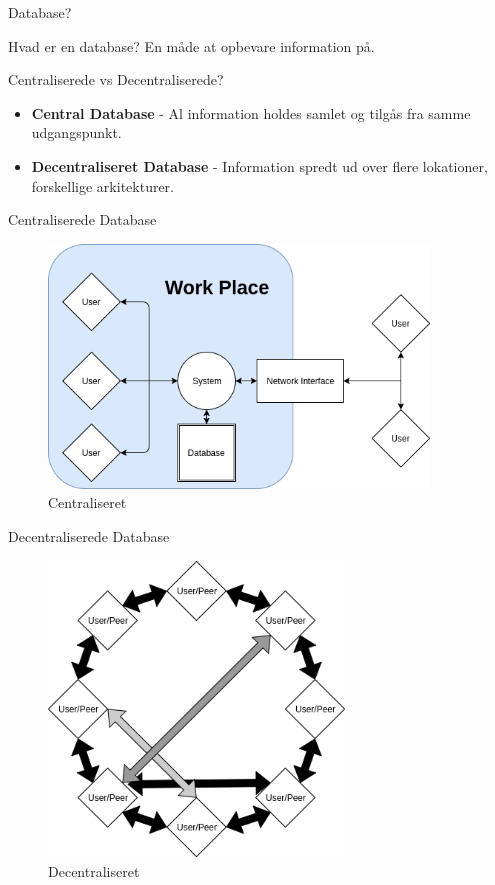 \documentclass[12pt,t]{beamer}
\begin{document}
\begin{frame}{Database?}

\begin{block}{Hvad er en database?}
	\pause
	En måde at opbevare information på.
\end{block}
\begin{block}{Centraliserede vs Decentraliserede?}
	\pause
	\begin{itemize}
		\item \textbf{Central Database} - Al information holdes samlet og tilgås fra samme udgangspunkt.
		\item \textbf{Decentraliseret Database} - Information spredt ud over flere lokationer, forskellige arkitekturer. 
	\end{itemize}
\end{block}

\end{frame}
\begin{frame}{Centraliserede Database}
\begin{figure}
	\centering
	\includegraphics[width=0.9\textwidth]{CS.png}
	\caption{Centraliseret}
\end{figure}
\end{frame}

\begin{frame}{Decentraliserede Database}
\begin{figure}
	\centering
	\includegraphics[width=0.7\textwidth]{dd.png}
	\caption{Decentraliseret}
\end{figure}
\end{frame}
\end{document}
